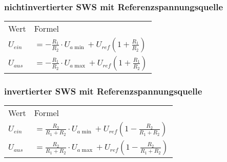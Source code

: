     \begin{minipage}[t][0.4\pdfpageheight][t]{0.5\columnwidth}
    \subsubsection{nichtinvertierter SWS mit Referenzspannungsquelle}
        \renewcommand{\arraystretch}{1.1}
        \begin{table}[H]
            \begin{tabularx}{\columnwidth}{l l}
               Wert & Formel \\
               $U_{ein}$ & $=-\frac{R_1}{R_2}\cdot U_{a\min}+U_{ref}(1+\frac{R_1}{R_2})$\\
               $U_{aus}$ & $=-\frac{R_1}{R_2}\cdot U_{a\max}+U_{ref}(1+\frac{R_1}{R_2})$\\
            \end{tabularx}
        \end{table}
    \end{minipage}
    \begin{minipage}[t][0.4\pdfpageheight][t]{0.5\columnwidth}
    \subsubsection{invertierter SWS mit Referenzspannungsquelle}
    \renewcommand{\arraystretch}{1.1}
        \begin{table}[H]
            \begin{tabularx}{\columnwidth}{l l}
               Wert & Formel \\ %
               $U_{ein}$ & $=\frac{R_2}{R_1+R_2}\cdot U_{a\min}+U_{ref}(1-\frac{R_2}{R_1+R_2})$\\
               $U_{aus}$ & $=\frac{R_2}{R_1+R_2}\cdot U_{a\max}+U_{ref}(1-\frac{R_2}{R_1+R_2})$\\
            \end{tabularx}
        \end{table}
    \end{minipage}
